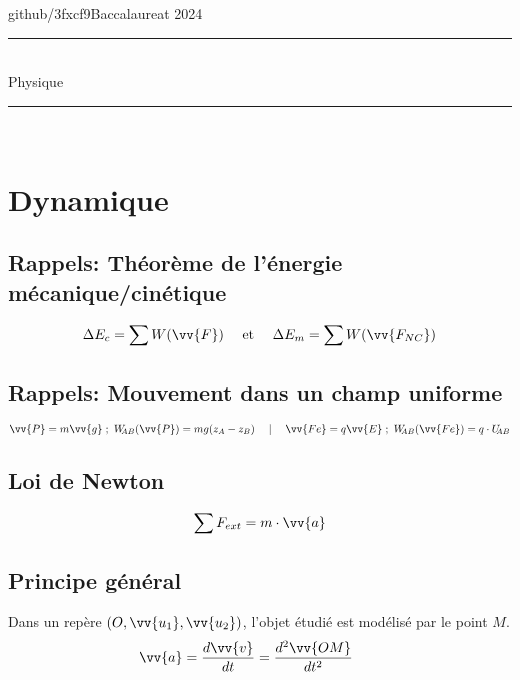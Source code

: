 \documentclass[a5paper,10pt]{article}
\newcommand{\assignmentauthor}{github/3fxcf9}
\newcommand{\assignmentdate}{Baccalaureat 2024}
\newcommand{\assignmenttitle}{Physique}
\renewcommand*{\vec}{\vv}
\begin{document}
\renewcommand{\headsep}{10pt}
\thispagestyle{empty}
\vspace*{-1cm}
\noindent\assignmentauthor \hfill \assignmentdate
\vspace{-6pt}
\begin{center}
    \rule[2ex]{\textwidth}{1pt}\\
    \vspace{-4pt}
    {\Large{\assignmenttitle}}
    \vspace{-4pt}
\end{center}
\rule[2ex]{\textwidth}{1pt}\\
\title{}
\author{}
\date{}
\vspace{-0.5cm}
\section{Dynamique}
\subsection{Rappels: Théorème de l'énergie mécanique/cinétique}
\[
	\Delta E_c = \sum W(\vec{F}) \quad\text{ et }\quad \Delta E_m = \sum W(\vec{F_{NC}})
\]
\subsection{Rappels: Mouvement dans un champ uniforme}
\[
  \vec{P}=m\vec{g}\;;\  W_{\!\!AB}(\vec{P})=mg(z_A-z_B) \quad\mid\quad \vec{Fe}=q\vec{E}\;;\  W_{\!\!AB}(\vec{Fe})=q\cdot U_{\!\!AB}
\]

\subsection{Loi de Newton}
$$\sum{F_{ext}}=m\cdot\vec{a}$$

\subsection{Principe général}
Dans un repère $(O, \vec{u_1}, \vec{u_2})$, l'objet étudié est modélisé par le point $M$.
$$\hspace{-2em}\vec{a}=\frac{d\vec{v}}{dt}=\frac{d^2\vec{OM}}{dt^2}$$
\end{document}
